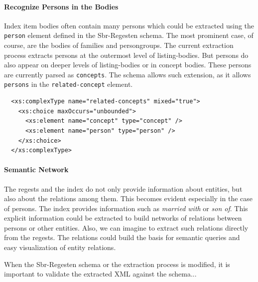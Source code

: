 \paragraph{Recognize Persons in the Bodies}
Index item bodies often contain many persons which could be extracted using the \texttt{person} element defined in the Sbr-Regesten schema. The most prominent case, of course, are the bodies of families and persongroups. The current extraction process extracts persons at the outermost level of listing-bodies. But persons do also appear on deeper levels of listing-bodies or in concept bodies. These persons are currently parsed as \texttt{concepts}. The schema allows such extension, as it allows \texttt{persons} in the \texttt{related-concept} element.

\begin{verbatim}
  <xs:complexType name="related-concepts" mixed="true">
    <xs:choice maxOccurs="unbounded">
      <xs:element name="concept" type="concept" />
      <xs:element name="person" type="person" />
    </xs:choice>
  </xs:complexType>
\end{verbatim}

\paragraph{Semantic Network}
The regests and the index do not only provide information about entities, but also about the relations among them. This becomes evident especially in the case of persons. The index provides information such as \textit{married with} or \textit{son of}. This explicit information could be extracted to build networks of relations between persons or other entities. Also, we can imagine to extract such relations directly from the regests. The relations could build the basis for semantic queries and easy visualization of entity relations.

When the Sbr-Regesten schema or the extraction process is modified, it is important to validate the extracted XML against the schema...
